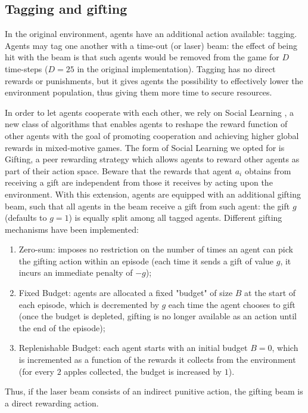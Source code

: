 \documentclass{article}
\begin{document}
\subsection{Tagging and gifting}
In the original environment, agents have an additional action available: tagging. Agents may tag one another with a time-out (or laser) beam: the effect of being hit with the beam is that such agents would be removed from the game for $D$ time-steps ($D=25$ in the original implementation). Tagging has no direct rewards or punishments, but it gives agents the possibility to effectively lower the environment population, thus giving them more time to secure resources.

In order to let agents cooperate with each other, we rely on Social Learning \cite{social-learning}, a new class of algorithms that enables agents to reshape the reward function of other agents with the goal of promoting cooperation and achieving higher global rewards in mixed-motive games. The form of Social Learning we opted for is Gifting, a peer rewarding strategy which allows agents to reward other agents as part of their action space. Beware that the rewards that agent $a_i$ obtains from receiving a gift are independent from those it receives by acting upon the environment. With this extension, agents are equipped with an additional gifting beam, such that all agents in the beam receive a gift from such agent: the gift $g$ (defaults to $g=1$) is equally split among all tagged agents. Different gifting mechanisms have been implemented:
\begin{enumerate}
  \item Zero-sum: imposes no restriction on the number of times an agent can pick the gifting action within an episode (each time it sends a gift of value $g$, it incurs an immediate penalty of $-g$);
  \item Fixed Budget: agents are allocated a fixed "budget" of size $B$ at the start of each episode, which is decremented by $g$ each time the agent chooses to gift (once the budget is depleted, gifting is no longer available as an action until the end of the episode);
  \item Replenishable Budget: each agent starts with an initial budget $B = 0$, which is incremented as a function of the rewards it collects from the environment (for every $2$ apples collected, the budget is increased by $1$).
\end{enumerate}

Thus, if the laser beam consists of an indirect punitive action, the gifting beam is a direct rewarding action.
\end{document}
